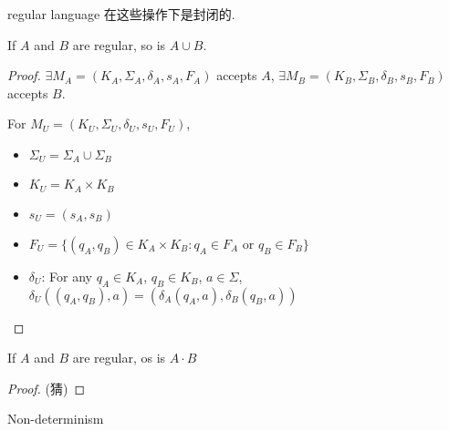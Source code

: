 regular language 在这些操作下是封闭的. 

\begin{theorem}
    If $A$ and $B$ are regular, so is $A\cup B$. 
\end{theorem}
\begin{proof}
    $\exists M_A=(K_A, \Sigma_A, \delta_A, s_A, F_A)$ accepts $A$, $\exists M_B=(K_B, \Sigma_B, \delta_B, s_B, F_B)$ accepts $B$.
    
    For $M_U=(K_U, \Sigma_U, \delta_U, s_U, F_U)$, 
    \begin{itemize}
        \item $\Sigma_U=\Sigma_A \cup \Sigma_B$
        \item $K_U=K_A\times K_B$
        \item $s_U=(s_A, s_B)$
        \item $F_U=\{ (q_A, q_B) \in K_A\times K_B:q_A\in F_A\text{ or }q_B\in F_B \}$
        \item $\delta_U$: For any $q_A\in K_A$, $q_B\in K_B$, $a\in \Sigma$, $\delta_U((q_A, q_B), a)=(\delta_A(q_A,a), \delta_B(q_B, a))$
    \end{itemize}
\end{proof}

\begin{theorem}
    If $A$ and $B$ are regular, os is $A\cdot B$
\end{theorem}
\begin{proof}
    (猜)
\end{proof}

Non-determinism
